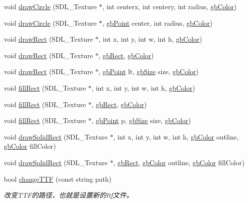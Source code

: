 \begin{DoxyCompactItemize}
void \mbox{\hyperlink{classgb_draw_tool_afa5a1ca83a9de5647a018a2532441689}{draw\+Circle}} (S\+D\+L\+\_\+\+Texture $\ast$, int centerx, int centery, int radius, \mbox{\hyperlink{classgb_color}{gb\+Color}})
\item 
void \mbox{\hyperlink{classgb_draw_tool_a57917a678517b8441ac9a44d71a03ec7}{draw\+Circle}} (S\+D\+L\+\_\+\+Texture $\ast$, \mbox{\hyperlink{classgb_point}{gb\+Point}} center, int radius, \mbox{\hyperlink{classgb_color}{gb\+Color}})
\item 
void \mbox{\hyperlink{classgb_draw_tool_a50324f2006b5afc55255fc2c345160c8}{draw\+Rect}} (S\+D\+L\+\_\+\+Texture $\ast$, int x, int y, int w, int h, \mbox{\hyperlink{classgb_color}{gb\+Color}})
\item 
void \mbox{\hyperlink{classgb_draw_tool_af1e0a5cb5cd456e5179be2a32414b7b9}{draw\+Rect}} (S\+D\+L\+\_\+\+Texture $\ast$, \mbox{\hyperlink{classgb_rect}{gb\+Rect}}, \mbox{\hyperlink{classgb_color}{gb\+Color}})
\item 
void \mbox{\hyperlink{classgb_draw_tool_a54752a6e858627a3a50f4592f6e41863}{draw\+Rect}} (S\+D\+L\+\_\+\+Texture $\ast$, \mbox{\hyperlink{classgb_point}{gb\+Point}} lt, \mbox{\hyperlink{classgb_size}{gb\+Size}} size, \mbox{\hyperlink{classgb_color}{gb\+Color}})
\item 
void \mbox{\hyperlink{classgb_draw_tool_a37df98d144867688ab337b30ab409846}{fill\+Rect}} (S\+D\+L\+\_\+\+Texture $\ast$, int x, int y, int w, int h, \mbox{\hyperlink{classgb_color}{gb\+Color}})
\item 
void \mbox{\hyperlink{classgb_draw_tool_a596096946e38b7de8ec4a2f990657218}{fill\+Rect}} (S\+D\+L\+\_\+\+Texture $\ast$, \mbox{\hyperlink{classgb_rect}{gb\+Rect}}, \mbox{\hyperlink{classgb_color}{gb\+Color}})
\item 
void \mbox{\hyperlink{classgb_draw_tool_acfcce703c9a678b983f3d0313ddbdd6c}{fill\+Rect}} (S\+D\+L\+\_\+\+Texture $\ast$, \mbox{\hyperlink{classgb_point}{gb\+Point}} p, \mbox{\hyperlink{classgb_size}{gb\+Size}} size, \mbox{\hyperlink{classgb_color}{gb\+Color}})
\item 
void \mbox{\hyperlink{classgb_draw_tool_a1f6f3a450894c006786e4e29737a196f}{draw\+Solid\+Rect}} (S\+D\+L\+\_\+\+Texture $\ast$, int x, int y, int w, int h, \mbox{\hyperlink{classgb_color}{gb\+Color}} outline, \mbox{\hyperlink{classgb_color}{gb\+Color}} fill\+Color)
\item 
void \mbox{\hyperlink{classgb_draw_tool_afebe0e6d5fe84875bef45c79390cd9f6}{draw\+Solid\+Rect}} (S\+D\+L\+\_\+\+Texture $\ast$, \mbox{\hyperlink{classgb_rect}{gb\+Rect}}, \mbox{\hyperlink{classgb_color}{gb\+Color}} outline, \mbox{\hyperlink{classgb_color}{gb\+Color}} fill\+Color)
\item 
bool \mbox{\hyperlink{classgb_draw_tool_ab0f81d461718f265cab6c48abe31241d}{change\+T\+TF}} (const string path)
\begin{DoxyCompactList}\small\item\em 改变\+T\+T\+F的路径，也就是设置新的ttf文件。 \end{DoxyCompactList}\end{DoxyCompactItemize}


